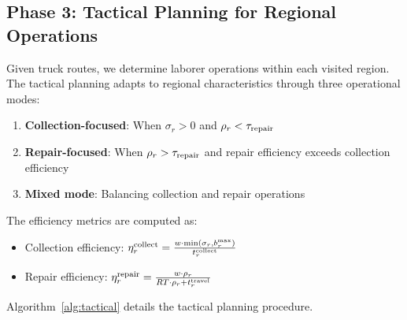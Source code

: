 \subsection{Phase 3: Tactical Planning for Regional Operations}

Given truck routes, we determine laborer operations within each visited region. The tactical planning adapts to regional characteristics through three operational modes:

\begin{enumerate}
    \item \textbf{Collection-focused}: When $\sigma_r > 0$ and $\rho_r < \tau_{\text{repair}}$
    \item \textbf{Repair-focused}: When $\rho_r > \tau_{\text{repair}}$ and repair efficiency exceeds collection efficiency
    \item \textbf{Mixed mode}: Balancing collection and repair operations
\end{enumerate}

The efficiency metrics are computed as:
\begin{itemize}
    \item Collection efficiency: $\eta^{\text{collect}}_r = \frac{w \cdot \min(\sigma_r, b^{\text{max}}_r)}{t^{\text{collect}}_r}$
    \item Repair efficiency: $\eta^{\text{repair}}_r = \frac{w \cdot \rho_r}{RT \cdot \rho_r + t^{\text{travel}}_r}$
\end{itemize}

Algorithm~\ref{alg:tactical} details the tactical planning procedure.

